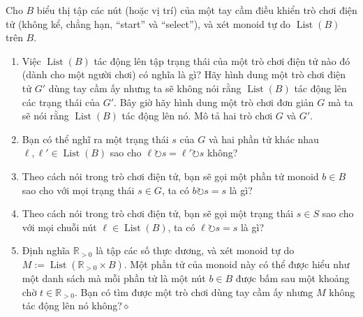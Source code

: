 Cho $B$ biểu thị tập các nút (hoặc vị trí) của một tay cầm điều khiển trò chơi điện tử (không kể, chẳng hạn, ``start'' và ``select''), và xét monoid tự do $\operatorname{List}(B)$ trên $B$.
\begin{enumerate}[label=\alph*.]
\item Việc $\operatorname{List}(B)$ tác động lên tập trạng thái của một trò chơi điện tử nào đó (dành cho một người chơi) có nghĩa là gì? Hãy hình dung một trò chơi điện tử $G'$ dùng tay cầm ấy nhưng ta sẽ không nói rằng $\operatorname{List}(B)$
tác động lên các trạng thái của $G'$. Bây giờ hãy hình dung một trò chơi đơn giản $G$ mà ta sẽ nói rằng $\operatorname{List}(B)$ tác động lên nó. Mô tả hai trò chơi $G$ và $G'$.
\item Bạn có thể nghĩ ra một trạng thái $s$ của $G$ và hai phần tử khác nhau $\ell,\ell'\in\operatorname{List}(B)$ sao cho $\ell\circlearrowright s=\ell'\circlearrowright s$ không?
\item Theo cách nói trong trò chơi điện tử, bạn sẽ gọi một phần tử monoid $b\in B$ sao cho với mọi trạng thái $s\in G$, ta có $b\circlearrowright s=s$ là gì?
\item Theo cách nói trong trò chơi điện tử, bạn sẽ gọi một trạng thái $s\in S$ sao cho với mọi chuỗi nút $\ell\in\operatorname{List}(B)$, ta có $\ell\circlearrowright s=s$ là gì?
\item Định nghĩa $\mathbb{R}_{>0}$ là tập các số thực dương, và xét monoid tự do $M:=\operatorname{List}(\mathbb{R}_{>0}\times B)$. Một phần tử của monoid này có thể được hiểu như một danh sách mà mỗi phần tử là một nút $b\in B$ được bấm sau một khoảng chờ $t\in\mathbb{R}_{>0}$. Bạn có tìm được một trò chơi dùng tay cầm ấy nhưng $M$ không tác động lên nó không?\nobreak\hfill$\diamond$
\end{enumerate}

